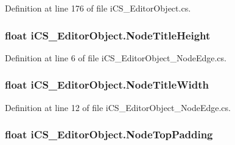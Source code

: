 Definition at line 176 of file i\+C\+S\+\_\+\+Editor\+Object.\+cs.

\hypertarget{classi_c_s___editor_object_acc0e19bc223b255ad8b2b64cf588ed20}{
\subsubsection[{Node\+Title\+Height}]{\setlength{\rightskip}{0pt plus 5cm}float i\+C\+S\+\_\+\+Editor\+Object.\+Node\+Title\+Height\hspace{0.3cm}{\ttfamily [get]}}}\label{classi_c_s___editor_object_acc0e19bc223b255ad8b2b64cf588ed20}


Definition at line 6 of file i\+C\+S\+\_\+\+Editor\+Object\+\_\+\+Node\+Edge.\+cs.

\hypertarget{classi_c_s___editor_object_a58fcc888ee7fbda2af72bebf95b7e143}{
\subsubsection[{Node\+Title\+Width}]{\setlength{\rightskip}{0pt plus 5cm}float i\+C\+S\+\_\+\+Editor\+Object.\+Node\+Title\+Width\hspace{0.3cm}{\ttfamily [get]}}}\label{classi_c_s___editor_object_a58fcc888ee7fbda2af72bebf95b7e143}


Definition at line 12 of file i\+C\+S\+\_\+\+Editor\+Object\+\_\+\+Node\+Edge.\+cs.

\hypertarget{classi_c_s___editor_object_ab0b08f07875c10b419b5884e025f8543}{
\subsubsection[{Node\+Top\+Padding}]{\setlength{\rightskip}{0pt plus 5cm}float i\+C\+S\+\_\+\+Editor\+Object.\+Node\+Top\+Padding\hspace{0.3cm}{\ttfamily [get]}}}\label{classi_c_s___editor_object_ab0b08f07875c10b419b5884e025f8543}



